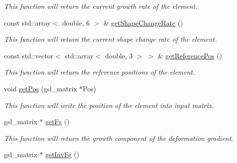 \begin{DoxyCompactItemize}
\begin{DoxyCompactList}\small\item\em This function will return the current growth rate of the element. \end{DoxyCompactList}\item 
\hypertarget{classShapeBase_ac5ca43e5283df3a948ab6e56f71fd3c6}{}const std\+::array$<$ double, 6 $>$ \& \hyperlink{classShapeBase_ac5ca43e5283df3a948ab6e56f71fd3c6}{get\+Shape\+Change\+Rate} ()\label{classShapeBase_ac5ca43e5283df3a948ab6e56f71fd3c6}

\begin{DoxyCompactList}\small\item\em This function will return the current shape change rate of the element. \end{DoxyCompactList}\item 
\hypertarget{classShapeBase_a8362daf177d7d30d0b02aca95a185b25}{}const std\+::vector$<$ std\+::array$<$ double, 3 $>$ $>$ \& \hyperlink{classShapeBase_a8362daf177d7d30d0b02aca95a185b25}{get\+Reference\+Pos} ()\label{classShapeBase_a8362daf177d7d30d0b02aca95a185b25}

\begin{DoxyCompactList}\small\item\em This function will return the reference positions of the element. \end{DoxyCompactList}\item 
\hypertarget{classShapeBase_ab1906a5afda8fcbeef23010759f2538c}{}void \hyperlink{classShapeBase_ab1906a5afda8fcbeef23010759f2538c}{get\+Pos} (gsl\+\_\+matrix $\ast$Pos)\label{classShapeBase_ab1906a5afda8fcbeef23010759f2538c}

\begin{DoxyCompactList}\small\item\em This function will write the position of the element into input matrix. \end{DoxyCompactList}\item 
\hypertarget{classShapeBase_a79889ef9cb7831a50e5391cb1cc19793}{}gsl\+\_\+matrix $\ast$ \hyperlink{classShapeBase_a79889ef9cb7831a50e5391cb1cc19793}{get\+Fg} ()\label{classShapeBase_a79889ef9cb7831a50e5391cb1cc19793}

\begin{DoxyCompactList}\small\item\em This function will return the growth component of the deformation gradient. \end{DoxyCompactList}\item 
\hypertarget{classShapeBase_aa79110e674e80a1e429669ccb5c3e4cb}{}gsl\+\_\+matrix $\ast$ \hyperlink{classShapeBase_aa79110e674e80a1e429669ccb5c3e4cb}{get\+Inv\+Fg} ()\label{classShapeBase_aa79110e674e80a1e429669ccb5c3e4cb}


\end{DoxyCompactItemize}

